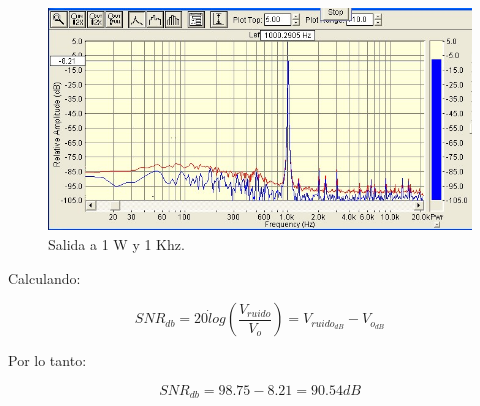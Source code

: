 			\begin{figure}[H]
				\centering
				\includegraphics[scale=0.6]{./Figuras/SNR_1K_1W_imagen2.jpg}
			\caption{Salida a 1 W y 1 Khz.}
			\end{figure}


			Calculando:

			\begin{equation*}
			SNR_{db}  = 20 \dot log(\frac{V_{ruido}}{V_o}) = V_{ruido_{dB}} - V_{o_{dB}}
			\end{equation*}

			Por lo tanto: 

			\begin{equation*}
			SNR_{db}  = 98.75 - 8.21 = 90.54 dB  
			\end{equation*}


%		
%
%
